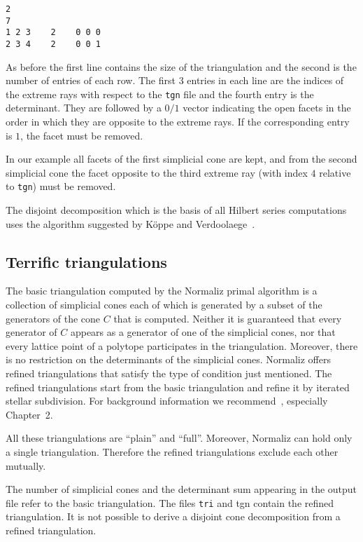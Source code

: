 \documentclass[12pt,a4paper]{scrartcl}
\theoremstyle{definition}
\def\ttt{\texttt}
\begin{document}
\begin{Verbatim}
2
7
1 2 3    2    0 0 0
2 3 4    2    0 0 1
\end{Verbatim}

As before the first line contains the size of the triangulation and the second is the number of entries of each row.
The first $3$ entries in each line are the indices of the extreme rays with respect to the \verb|tgn| file and the fourth entry is the determinant. They are followed by a $0/1$ vector indicating the open facets in the order in which they are opposite to the extreme rays. If the corresponding entry is $1$, the facet must be removed.

In our example all facets of the first simplicial cone are kept, and from the second simplicial cone the facet opposite to the third extreme ray (with index $4$ relative to \verb|tgn|) must be removed.

The disjoint decomposition which is the basis of all Hilbert series computations uses the algorithm suggested by K\"oppe and Verdoolaege~\cite{KV}.

\subsection{Terrific triangulations}

The basic triangulation computed by the Normaliz primal algorithm is a collection of simplicial cones each of which is generated by a subset of the generators of the cone $C$ that is computed. Neither it is guaranteed that every generator of $C$ appears as a generator of one of the simplicial cones, nor that every lattice point of a polytope participates in the triangulation. Moreover, there is no restriction on the determinants of the simplicial cones. Normaliz offers refined triangulations that satisfy the type of condition just mentioned. The refined triangulations start from the basic triangulation and refine it by iterated stellar subdivision. For background information we recommend~\cite{BG}, especially Chapter~2.

All these triangulations are ``plain'' and ``full''. Moreover, Normaliz can hold only a single triangulation. Therefore the refined triangulations exclude each other mutually.

The number of simplicial cones and the determinant sum appearing in the output file refer to the basic triangulation. The files \ttt{tri} and {tgn} contain the refined triangulation. It is not possible to derive a disjoint cone decomposition from a refined triangulation.
\end{document}

